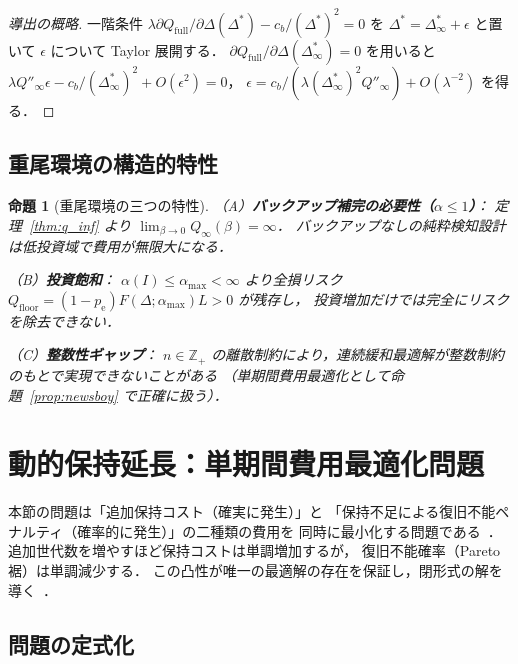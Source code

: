 \documentclass[12pt,a4paper]{article}
\theoremstyle{plain}
\newtheorem{proposition}[theorem]{命題}
\theoremstyle{definition}
\theoremstyle{remark}
\newcommand{\Z}{\mathbb{Z}}
\newcommand{\pe}{p_{\mathrm{e}}}
\newcommand{\Qf}{Q_{\mathrm{full}}}
\newcommand{\Qinf}{Q_{\infty}}
\newcommand{\alphI}{\alpha(I)}
\newcommand{\Dopt}{\Delta^{*}}
\newcommand{\Dinf}{\Delta^{*}_{\infty}}
\begin{document}
\begin{proof}[導出の概略]
一階条件 $\lambda\partial\Qf/\partial\Delta(\Dopt)-c_b/(\Dopt)^2=0$ を
$\Dopt=\Dinf+\epsilon$ と置いて $\epsilon$ について Taylor 展開する．
$\partial\Qf/\partial\Delta(\Dinf)=0$ を用いると
$\lambda Q''_\infty\epsilon-c_b/(\Dinf)^2+O(\epsilon^2)=0$，
$\epsilon=c_b/(\lambda(\Dinf)^2 Q''_\infty)+O(\lambda^{-2})$ を得る．
\end{proof}

\subsection{重尾環境の構造的特性}

\begin{proposition}[重尾環境の三つの特性]\label{prop:structural}
\noindent（A）\textbf{バックアップ補完の必要性（$\alpha\le1$）}：
定理~\ref{thm:q_inf} より $\lim_{\beta\to0}\Qinf(\beta)=\infty$．
バックアップなしの純粋検知設計は低投資域で費用が無限大になる．

\noindent（B）\textbf{投資飽和}：
$\alphI\le\alpha_{\max}<\infty$ より全損リスク $Q_{\mathrm{floor}}=(1-\pe)F(\Delta;\alpha_{\max})L>0$ が残存し，
投資増加だけでは完全にリスクを除去できない．

\noindent（C）\textbf{整数性ギャップ}：
$n\in\Z_+$ の離散制約により，連続緩和最適解が整数制約のもとで実現できないことがある
（単期間費用最適化として命題~\ref{prop:newsboy} で正確に扱う）．
\end{proposition}

\section{動的保持延長：単期間費用最適化問題}
\label{sec:newsboy}

\begin{tcolorbox}[mathbox, title={単期間費用最適化問題の構造}]
本節の問題は「追加保持コスト（確実に発生）」と
「保持不足による復旧不能ペナルティ（確率的に発生）」の二種類の費用を
同時に最小化する問題である~\cite{porteus2002,zipkin2000}．
追加世代数を増やすほど保持コストは単調増加するが，
復旧不能確率（Pareto 裾）は単調減少する．
この凸性が唯一の最適解の存在を保証し，閉形式の解を導く~\cite{silver1998}．
\end{tcolorbox}

\subsection{問題の定式化}
\end{document}
